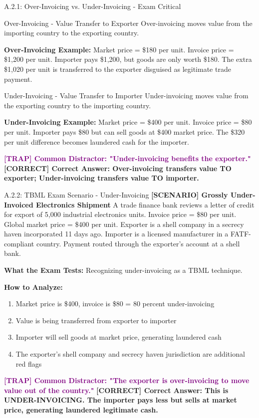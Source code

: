 \documentclass[11pt,a4paper]{beamer}
\newcommand{\trap}[1]{\textcolor{purple}{\textbf{[TRAP] #1}}}
\newcommand{\correct}[1]{\textcolor{green!50!black}{\textbf{[CORRECT] #1}}}
\newcommand{\scenario}[1]{\textcolor{blue!70!black}{\textbf{[SCENARIO] #1}}}
\begin{document}
	\begin{frame}{A.2.1: Over-Invoicing vs. Under-Invoicing - Exam Critical}
		\begin{block}{Over-Invoicing - Value Transfer to Exporter}
			Over-invoicing moves value from the importing country to the exporting country.
		\end{block}
		\textbf{Over-Invoicing Example:}
		Market price = \$180 per unit. Invoice price = \$1,200 per unit. Importer pays \$1,200, but goods are only worth \$180. The extra \$1,020 per unit is transferred to the exporter disguised as legitimate trade payment.
		
		\begin{block}{Under-Invoicing - Value Transfer to Importer}
			Under-invoicing moves value from the exporting country to the importing country.
		\end{block}
		\textbf{Under-Invoicing Example:}
		Market price = \$400 per unit. Invoice price = \$80 per unit. Importer pays \$80 but can sell goods at \$400 market price. The \$320 per unit difference becomes laundered cash for the importer.
		
		\trap{Common Distractor: "Under-invoicing benefits the exporter."}
		\correct{Correct Answer: Over-invoicing transfers value TO exporter; Under-invoicing transfers value TO importer.}
	\end{frame}
	
	\begin{frame}{A.2.2: TBML Exam Scenario - Under-Invoicing}
		\scenario{Grossly Under-Invoiced Electronics Shipment}
		A trade finance bank reviews a letter of credit for export of 5,000 industrial electronics units. Invoice price = \$80 per unit. Global market price = \$400 per unit. Exporter is a shell company in a secrecy haven incorporated 11 days ago. Importer is a licensed manufacturer in a FATF-compliant country. Payment routed through the exporter's account at a shell bank.
		
		\vspace{0.1cm}
		\textbf{What the Exam Tests:} Recognizing under-invoicing as a TBML technique.
		
		\vspace{0.1cm}
		\textbf{How to Analyze:}
		\begin{enumerate}
			\item Market price is \$400, invoice is \$80 = 80 percent under-invoicing
			\item Value is being transferred from exporter to importer
			\item Importer will sell goods at market price, generating laundered cash
			\item The exporter's shell company and secrecy haven jurisdiction are additional red flags
		\end{enumerate}
		
		\trap{Common Distractor: "The exporter is over-invoicing to move value out of the country."}
		\correct{Correct Answer: This is UNDER-INVOICING. The importer pays less but sells at market price, generating laundered legitimate cash.}
	\end{frame}
	
\end{document}
